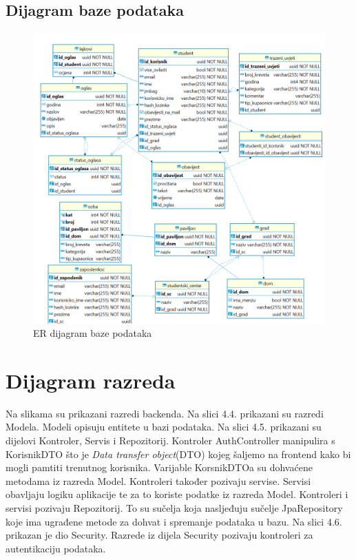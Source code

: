 	
	
	
	\subsection{Dijagram baze podataka}
	\begin{figure}[H]
		\includegraphics[scale=0.4]{dijagrami/ERDijagram.png} %
		\centering
		\caption{ER dijagram baze podataka}
		\label{fig:er}
	\end{figure}
	
	\eject
	
			
			
		\section{Dijagram razreda}
		
			Na slikama su prikazani razredi backenda. Na slici 4.4. prikazani su razredi Modela. Modeli opisuju entitete u bazi podataka. Na slici 4.5. prikazani su dijelovi Kontroler, Servis i Repozitorij. Kontroler AuthController manipulira s KorisnikDTO što je \textit{Data transfer object}(DTO) kojeg šaljemo na frontend kako bi mogli pamtiti trenutnog korisnika. Varijable KorsnikDTOa su dohvaćene metodama iz razreda Model.
			Kontroleri također pozivaju servise. Servisi obavljaju logiku aplikacije te za to koriste podatke iz razreda Model. Kontroleri i servisi pozivaju Repozitorij. To su sučelja koja nasljeđuju sučelje JpaRepository koje ima ugrađene metode za dohvat i spremanje podataka u bazu. Na slici 4.6. prikazan je dio Security. Razrede iz dijela Security pozivaju kontroleri za autentikaciju podataka.
		
